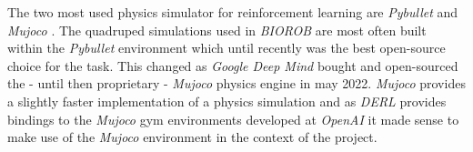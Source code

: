 The two most used physics simulator for reinforcement learning are \textit{Pybullet} \cite{pybullet} and \textit{Mujoco} \cite{mujoco}. The quadruped simulations used in \textit{BIOROB} are most often built within the \textit{Pybullet} environment which until recently was the best open-source choice for the task. This changed as \textit{Google Deep Mind} bought and open-sourced the - until then proprietary - \textit{Mujoco} physics engine in may 2022. \textit{Mujoco} provides a slightly faster implementation of a physics simulation and as \textit{DERL} provides bindings to the \textit{Mujoco} gym environments developed at \textit{OpenAI} it made sense to make use of the \textit{Mujoco} environment in the context of the project.


